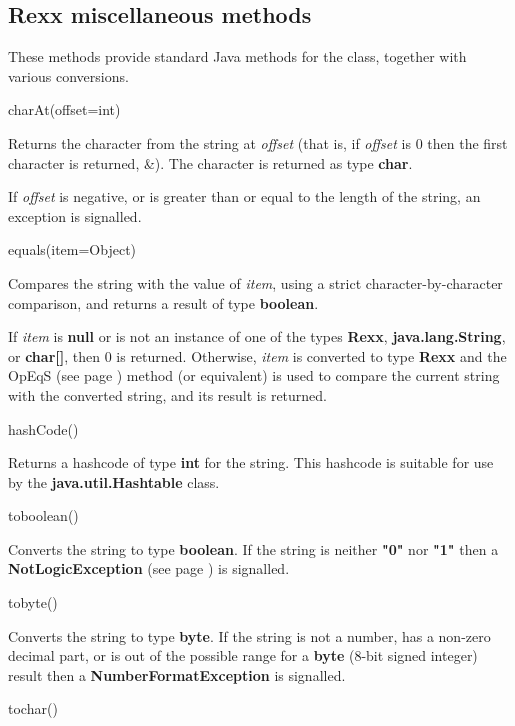 \subsection{Rexx miscellaneous methods}\label{"id"}
 These methods provide standard Java methods for the class, together with
various conversions.
\begin{description}
\item{charAt(offset=int)}

Returns the character from the string at \emph{offset} (that is, if
\emph{offset} is 0 then the first character is returned, \&).
The character is returned as type \textbf{char}.
 
If \emph{offset} is negative, or is greater than or equal to the
length of the string, an exception is signalled.
\item{equals(item=Object)}

Compares the string with the value of \emph{item}, using a strict
character-by-character comparison, and returns a result of
type \textbf{boolean}.
 
If \emph{item} is \textbf{null} or is not an instance of one of
the types \textbf{Rexx}, \textbf{java.lang.String}, or \textbf{char[]},
then 0 is returned.
Otherwise, \emph{item} is converted to type \textbf{Rexx} and the
 OpEqS (see page \pageref{refopeqs})  method (or equivalent) is used to compare the
current string with the converted string, and its result is returned.
\item{hashCode()}

Returns a hashcode of type \textbf{int} for the string.
This hashcode is suitable for use by the \textbf{java.util.Hashtable}
class.
\item{toboolean()}

Converts the string to type \textbf{boolean}.  If the string is
neither \textbf{"0"} nor \textbf{"1"} then
a  \textbf{NotLogicException} (see page \pageref{refexpnle})  is signalled.
\item{tobyte()}

Converts the string to type \textbf{byte}.  If the string is
not a number, has a non-zero decimal part, or is out of the possible
range for a \textbf{byte} (8-bit signed integer) result then
a \textbf{NumberFormatException} is signalled.
\item{tochar()}


\end{description}
